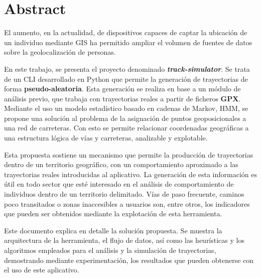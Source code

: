 
\chapter*{Abstract}
El aumento, en la actualidad, de dispositivos capaces de captar la ubicación de un 
individuo mediante \ac{GIS} ha permitido ampliar el volumen de fuentes de datos sobre la 
geolocalización de personas. 

En este trabajo, se presenta el proyecto denominado \textit{\textbf{track-simulator}}. Se 
trata de un \ac{CLI} desarrollado en Python que permite la generación de trayectorias de 
forma \textbf{pseudo-aleatoria}. Esta generación se realiza en base a un módulo de 
análisis previo, que trabaja con trayectorias reales a partir de ficheros \textbf{\ac{GPX}}. 
Mediante el uso un modelo estadístico basado en cadenas de Markov, \ac{HMM}, se 
propone una solución al problema de la asignación de puntos geoposicionales a una red 
de carreteras. Con esto se permite relacionar coordenadas geográficas a una estructura 
lógica de vías y carreteras, analizable y explotable.

Esta propuesta sostiene un mecanismo que permite la producción de trayectorias dentro 
de un territorio geográfico, con un comportamiento aproximado a las trayectorias reales 
introducidas al aplicativo. La generación de esta información es útil en todo sector que 
esté interesado en el análisis de comportamiento de individuos dentro de un territorio 
delimitado. Vías de paso frecuente, caminos poco transitados o zonas inaccesibles a 
usuarios son, entre otros, los indicadores que pueden ser obtenidos mediante la 
explotación de esta herramienta.

Este documento explica en detalle la solución propuesta. Se muestra la arquitectura de la 
herramienta, el flujo de datos, así como las heurísticas y los algoritmos empleados para el 
análisis y la simulación de trayectorias, demostrando mediante experimentación, los 
resultados que pueden obtenerse con el uso de este aplicativo.